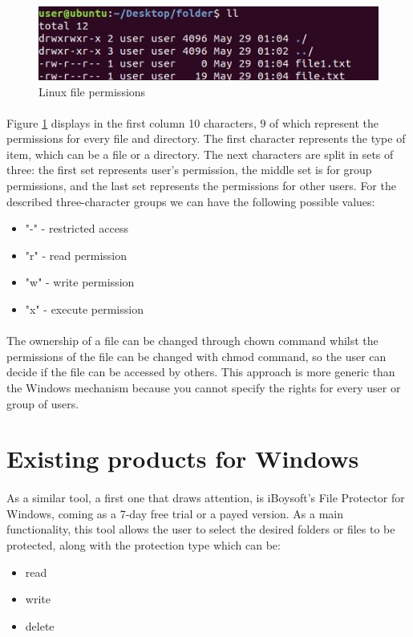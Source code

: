 	\begin{figure}[h!]
		\includegraphics[width=\linewidth]{images/linuxFilePermissions.jpg}
		\caption{Linux file permissions}
		\label{fig:linuxFilePermissions}
	\end{figure}
	
	\paragraph{}
	Figure \ref{fig:linuxFilePermissions} displays in the first column 10 characters, 9 of which represent the permissions for every file and directory. The first character represents the type of item, which can be a file or a directory. The next characters are split in sets of three: the first set represents user's permission, the middle set is for group permissions, and the last set represents the permissions for other users. For the described three-character groups we can have the following possible values:
	\begin{itemize}
		\item "-" - restricted access
		\item "r" - read permission
		\item "w" - write permission
		\item "x" - execute permission
	\end{itemize}
	
	\paragraph{}
	The ownership of a file can be changed through chown command whilst the permissions of the file can be changed with chmod command, so the user can decide if the file can be accessed by others. This approach is more generic than the Windows mechanism because you cannot specify the rights for every user or group of users.
	
		
	\section{Existing products for Windows}
	\paragraph{}
	As a similar tool, a first one that draws attention, is iBoysoft's File Protector for Windows, coming as a 7-day free trial or a payed version. As a main functionality, this tool allows the user to select the desired folders or files to be protected, along with the protection type which can be:
	\begin{itemize}
		\item read
		\item write
		\item delete
	\end{itemize}
	
